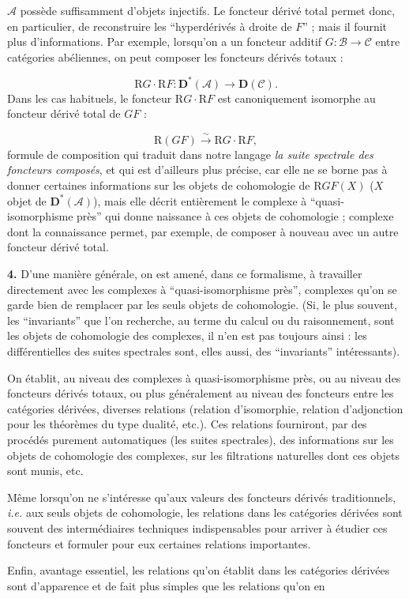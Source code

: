 %
$\mathcal A$ possède suffisamment d'objets injectifs. Le foncteur dérivé
total permet donc, en particulier, de reconstruire les ``hyperdérivés à droite
de $F$'' ; mais il fournit plus d'informations. Par exemple, lorsqu'on a un
foncteur additif $G:\mathcal B\to\mathcal C$ entre catégories abéliennes, on
peut composer les foncteurs dérivés totaux :

\[
\mathrm R G\mathbin{\cdot}\mathrm R F:
\mathbf D^*(\mathcal A)\longrightarrow\mathbf D(\mathcal C).
\]
Dans les cas habituels, le foncteur
$\mathrm R G\mathbin{\cdot}\mathrm R F$ est canoniquement isomorphe au
foncteur dérivé total de $GF$ :

\[
\mathrm R(GF)\xrightarrow{\sim}
\mathrm R G\mathbin{\cdot}\mathrm R F,
\]
formule de composition qui traduit dans notre langage
\emph{la suite spectrale des foncteurs composés}, et qui est d'ailleurs plus
précise, car elle ne se borne pas à donner certaines informations sur les
objets de cohomologie de $\mathrm R GF(X)$
($X$ objet de $\mathbf D^*(\mathcal A)$), mais elle décrit entièrement le
complexe à ``quasi-isomorphisme près'' qui donne naissance à ces objets de
cohomologie ; complexe dont la connaissance permet, par exemple, de composer
à nouveau avec un autre foncteur dérivé total.

\noindent\textbf{4.}\quad
D'une manière générale, on est amené, dans ce formalisme, à travailler
directement avec les complexes à ``quasi-isomorphisme près'', complexes qu'on
se garde bien de remplacer par les seuls objets de cohomologie. (Si, le plus
souvent, les ``invariants'' que l'on recherche, au terme du calcul ou du
raisonnement, sont les objets de cohomologie des complexes, il n'en est pas
toujours ainsi : les différentielles des suites spectrales sont, elles aussi,
des ``invariants'' intéressants).

On établit, au niveau des complexes à quasi-isomorphisme près, ou au niveau des
foncteurs dérivés totaux, ou plus généralement au niveau des foncteurs entre
les catégories dérivées, diverses relations (relation d'isomorphie, relation
d'adjonction pour les théorèmes du type dualité, etc.). Ces relations
fourniront, par des procédés purement automatiques (les suites spectrales), des
informations sur les objets de cohomologie des complexes, sur les filtrations
naturelles dont ces objets sont munis, etc.

Même lorsqu'on ne s'intéresse qu'aux valeurs des foncteurs dérivés
traditionnels, \emph{i.e.} aux seuls objets de cohomologie, les relations dans
les catégories dérivées sont souvent des intermédiaires techniques
indispensables pour arriver à étudier ces foncteurs et formuler pour eux
certaines relations importantes.

Enfin, avantage essentiel, les relations qu'on établit dans les catégories
dérivées sont d'apparence et de fait plus simples que les relations qu'on en
